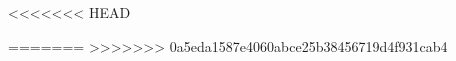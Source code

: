 \documentclass[letterpaper,12pt]{article}
\begin{document}
    
    


    
    
    

%

<<<<<<< HEAD

=======
>>>>>>> 0a5eda1587e4060abce25b38456719d4f931cab4

% 
\end{document}
